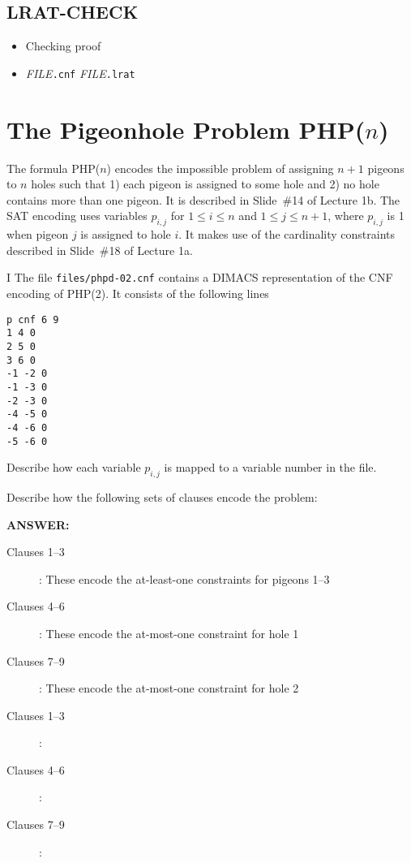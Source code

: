 \subsection*{LRAT-CHECK}

\begin{itemize}
\item Checking proof
\item[] {\it FILE}\texttt{.cnf} {\it FILE}\texttt{.lrat}
\end{itemize}



\newpage

\section*{The Pigeonhole Problem PHP($n$)}


The formula PHP($n$) encodes the impossible problem of assigning $n+1$
pigeons to $n$ holes such that 1) each pigeon is assigned to some hole
and 2) no hole contains more than one pigeon.  It is described in
Slide~\#14 of Lecture 1b.  The SAT encoding uses variables $p_{i,j}$
for $1 \leq i \leq n$ and $1 \leq j \leq n+1$, where $p_{i,j}$ is 1
when pigeon $j$ is assigned to hole $i$.  It makes use of
the cardinality constraints described in Slide~\#18 of Lecture 1a.
\medskip

\begin{problem}{I}
The file \texttt{files/phpd-02.cnf} contains
a DIMACS representation of the CNF encoding of PHP(2).
It consists of the following lines
\begin{lstlisting}
p cnf 6 9
1 4 0
2 5 0
3 6 0
-1 -2 0
-1 -3 0
-2 -3 0
-4 -5 0
-4 -6 0
-5 -6 0
\end{lstlisting}

\begin{choice}
\item Describe how each variable $p_{i,j}$ is mapped to a variable number in the file.

\item Describe how the following sets of clauses encode the problem:

\ifshowsolutions
$\;$\\[1ex]{\bf ANSWER:}
  \begin{description}
    \item[Clauses 1--3]: These encode the at-least-one constraints for pigeons 1--3
    \item[Clauses 4--6]: These encode the at-most-one constraint for hole 1
    \item[Clauses 7--9]: These encode the at-most-one constraint for hole 2
  \end{description}
\else
  \begin{description}
    \item[Clauses 1--3]:
    \item[Clauses 4--6]:
    \item[Clauses 7--9]:
  \end{description}
\fi
\end{choice}
\end{problem}

